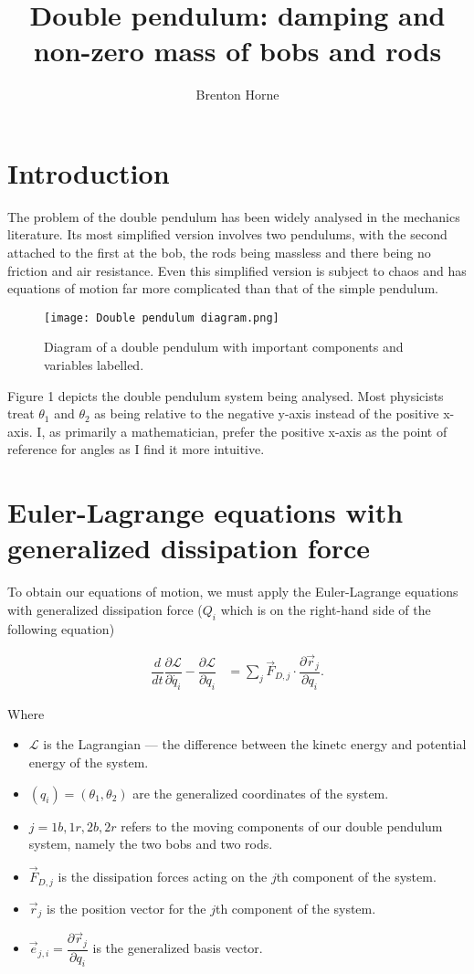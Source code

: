 \documentclass[12pt,a4paper,portrait]{article}
\date{}
\title{Double pendulum: damping and non-zero mass of bobs and rods}
\author{Brenton Horne}
\begin{document}
	\maketitle
	\tableofcontents
	
	\section{Introduction}
	The problem of the double pendulum has been widely analysed in the mechanics literature. Its most simplified version involves two pendulums, with the second attached to the first at the bob, the rods being massless and there being no friction and air resistance. Even this simplified version is subject to chaos and has equations of motion far more complicated than that of the simple pendulum.  
	\begin{figure}[H]
		\centering
		\texttt{[image: Double pendulum diagram.png]}
		\caption{Diagram of a double pendulum with important components and variables labelled.}
	\end{figure}
	Figure 1 depicts the double pendulum system being analysed. Most physicists treat $\theta_1$ and $\theta_2$ as being relative to the negative y-axis instead of the positive x-axis. I, as primarily a mathematician, prefer the positive x-axis as the point of reference for angles as I find it more intuitive. 
	
	\section{Euler-Lagrange equations with generalized dissipation force}
	To obtain our equations of motion, we must apply the Euler-Lagrange equations with generalized dissipation force ($Q_i$ which is on the right-hand side of the following equation)
	
	\begin{align}
		\dfrac{d}{dt}\dfrac{\partial \mathcal{L}}{\partial \dot{q_i}} - \dfrac{\partial \mathcal{L}}{\partial q_i} &=  \sum_j \vec{F}_{D,j} \cdot \dfrac{\partial \vec{r}_j}{\partial q_i}. \label{ELD}
	\end{align}
	
	Where
	\begin{itemize}
		\item $\mathcal{L}$ is the Lagrangian --- the difference between the kinetc energy and potential energy of the system. 
		\item $(q_i)=(\theta_1,\theta_2)$ are the generalized coordinates of the system.
		\item $j=1b,1r,2b,2r$ refers to the moving components of our double pendulum system, namely the two bobs and two rods.
		\item $\vec{F}_{D,j}$ is the dissipation forces acting on the $j$th component of the system.
		\item $\vec{r}_j$ is the position vector for the $j$th component of the system.
		\item $\vec{e}_{j,i}=\dfrac{\partial \vec{r}_j}{\partial q_i}$ is the generalized basis vector.
	\end{itemize}
	
\end{document}
